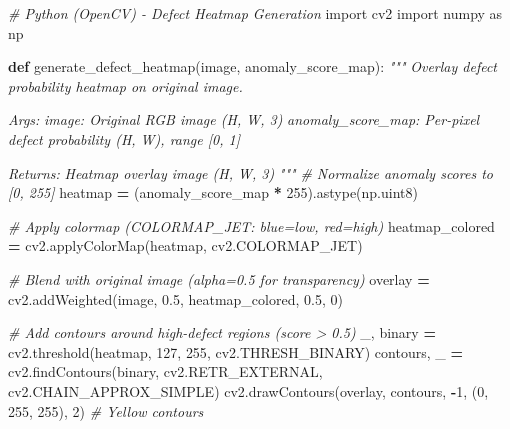 \documentclass[
]{article}
\newenvironment{Shaded}{\begin{snugshade}}{\end{snugshade}}
\newcommand{\CommentTok}[1]{\textcolor[rgb]{0.56,0.35,0.01}{\textit{#1}}}
\newcommand{\DecValTok}[1]{\textcolor[rgb]{0.00,0.00,0.81}{#1}}
\newcommand{\FloatTok}[1]{\textcolor[rgb]{0.00,0.00,0.81}{#1}}
\newcommand{\ImportTok}[1]{#1}
\newcommand{\KeywordTok}[1]{\textcolor[rgb]{0.13,0.29,0.53}{\textbf{#1}}}
\newcommand{\NormalTok}[1]{#1}
\newcommand{\OperatorTok}[1]{\textcolor[rgb]{0.81,0.36,0.00}{\textbf{#1}}}
\begin{document}
\begin{Shaded}
\begin{Highlighting}[]
\CommentTok{\# Python (OpenCV) {-} Defect Heatmap Generation}
\ImportTok{import}\NormalTok{ cv2}
\ImportTok{import}\NormalTok{ numpy }\ImportTok{as}\NormalTok{ np}

\KeywordTok{def}\NormalTok{ generate\_defect\_heatmap(image, anomaly\_score\_map):}
    \CommentTok{"""}
\CommentTok{    Overlay defect probability heatmap on original image.}

\CommentTok{    Args:}
\CommentTok{        image: Original RGB image (H, W, 3)}
\CommentTok{        anomaly\_score\_map: Per{-}pixel defect probability (H, W), range [0, 1]}

\CommentTok{    Returns:}
\CommentTok{        Heatmap overlay image (H, W, 3)}
\CommentTok{    """}
    \CommentTok{\# Normalize anomaly scores to [0, 255]}
\NormalTok{    heatmap }\OperatorTok{=}\NormalTok{ (anomaly\_score\_map }\OperatorTok{*} \DecValTok{255}\NormalTok{).astype(np.uint8)}

    \CommentTok{\# Apply colormap (COLORMAP\_JET: blue=low, red=high)}
\NormalTok{    heatmap\_colored }\OperatorTok{=}\NormalTok{ cv2.applyColorMap(heatmap, cv2.COLORMAP\_JET)}

    \CommentTok{\# Blend with original image (alpha=0.5 for transparency)}
\NormalTok{    overlay }\OperatorTok{=}\NormalTok{ cv2.addWeighted(image, }\FloatTok{0.5}\NormalTok{, heatmap\_colored, }\FloatTok{0.5}\NormalTok{, }\DecValTok{0}\NormalTok{)}

    \CommentTok{\# Add contours around high{-}defect regions (score \textgreater{} 0.5)}
\NormalTok{    \_, binary }\OperatorTok{=}\NormalTok{ cv2.threshold(heatmap, }\DecValTok{127}\NormalTok{, }\DecValTok{255}\NormalTok{, cv2.THRESH\_BINARY)}
\NormalTok{    contours, \_ }\OperatorTok{=}\NormalTok{ cv2.findContours(binary, cv2.RETR\_EXTERNAL, cv2.CHAIN\_APPROX\_SIMPLE)}
\NormalTok{    cv2.drawContours(overlay, contours, }\OperatorTok{{-}}\DecValTok{1}\NormalTok{, (}\DecValTok{0}\NormalTok{, }\DecValTok{255}\NormalTok{, }\DecValTok{255}\NormalTok{), }\DecValTok{2}\NormalTok{)  }\CommentTok{\# Yellow contours}


\end{Highlighting}
\end{Shaded}
\end{document}
